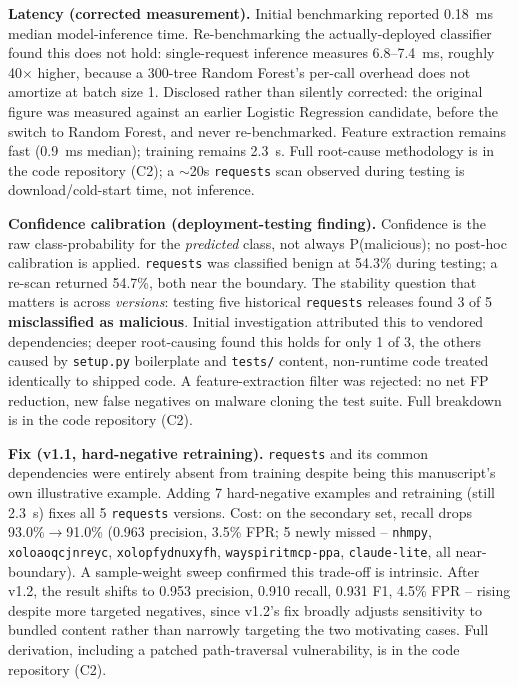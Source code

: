 \documentclass[preprint,12pt, a4paper]{elsarticle}
\begin{document}
\begin{enumerate}
\textbf{Latency (corrected measurement).} Initial benchmarking reported 0.18~ms median model-inference time. Re-benchmarking the actually-deployed classifier found this does not hold: single-request inference measures 6.8--7.4~ms, roughly 40$\times$ higher, because a 300-tree Random Forest's per-call overhead does not amortize at batch size 1. Disclosed rather than silently corrected: the original figure was measured against an earlier Logistic Regression candidate, before the switch to Random Forest, and never re-benchmarked. Feature extraction remains fast (0.9~ms median); training remains 2.3~s. Full root-cause methodology is in the code repository (C2); a $\sim$20s \texttt{requests} scan observed during testing is download/cold-start time, not inference.

\textbf{Confidence calibration (deployment-testing finding).} Confidence is the raw class-probability for the \emph{predicted} class, not always P(malicious); no post-hoc calibration is applied. \texttt{requests} was classified benign at 54.3\% during testing; a re-scan returned 54.7\%, both near the boundary. The stability question that matters is across \emph{versions}: testing five historical \texttt{requests} releases found 3 of 5 \textbf{misclassified as malicious}. Initial investigation attributed this to vendored dependencies; deeper root-causing found this holds for only 1 of 3, the others caused by \texttt{setup.py} boilerplate and \texttt{tests/} content, non-runtime code treated identically to shipped code. A feature-extraction filter was rejected: no net FP reduction, new false negatives on malware cloning the test suite. Full breakdown is in the code repository (C2).

\textbf{Fix (v1.1, hard-negative retraining).} \texttt{requests} and its common dependencies were entirely absent from training despite being this manuscript's own illustrative example. Adding 7 hard-negative examples and retraining (still 2.3~s) fixes all 5 \texttt{requests} versions. Cost: on the secondary set, recall drops 93.0\%$\to$91.0\% (0.963 precision, 3.5\% FPR; 5 newly missed -- \texttt{nhmpy}, \texttt{xoloaoqcjnreyc}, \texttt{xolopfydnuxyfh}, \texttt{wayspiritmcp-ppa}, \texttt{claude-lite}, all near-boundary). A sample-weight sweep confirmed this trade-off is intrinsic. After v1.2, the result shifts to 0.953 precision, 0.910 recall, 0.931 F1, 4.5\% FPR -- rising despite more targeted negatives, since v1.2's fix broadly adjusts sensitivity to bundled content rather than narrowly targeting the two motivating cases. Full derivation, including a patched path-traversal vulnerability, is in the code repository (C2).


\end{enumerate}
\end{document}
